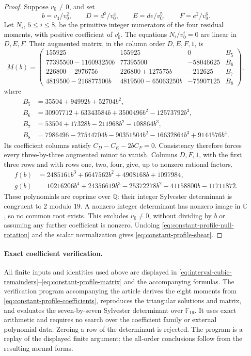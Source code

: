 \begin{proof}
Suppose \(v_0\ne0\), and set
\[
 b=v_1/v_0^2,\qquad D=d^2/v_0^4,\qquad E=de/v_0^5,\qquad F=e^2/v_0^6.
\]
Let \(N_i\), \(5\le i\le8\), be the primitive integer numerators of
the four residual moments, with positive coefficient of \(v_0^i\).
The equations \(N_i/v_0^i=0\) are linear in \(D,E,F\). Their augmented
matrix, in the column order \(D,E,F,1\), is
\begin{equation}
 M(b)=\begin{pmatrix}
 155925&155925&0&B_5\\
 77395500-116093250b&77395500&-58046625&B_6\\
 226800-297675b&226800+127575b&-212625&B_7\\
 4819500-216877500b&4819500-65063250b&-75907125&B_8
 \end{pmatrix},
 \label{eq:constant-profile-matrix}
\end{equation}
where
\begin{align*}
 B_5&=35504+94992b+52704b^2,\\
 B_6&=30907712+63343584b+3500496b^2-12573792b^3,\\
 B_7&=53504+17328b-211968b^2-108864b^3,\\
 B_8&=7986496-27544704b-90351504b^2-16632864b^3+9144576b^4.
\end{align*}
Its coefficient columns satisfy \(C_D-C_E-2bC_F=0\). Consistency
therefore forces every three-by-three augmented minor to vanish.
Columns \(D,F,1\), with the first three rows and with rows one, two,
four, give, up to nonzero rational factors,
\begin{align*}
 f(b)&=2485161b^3+6647562b^2+4908168b+1097984,\\
 g(b)&=10216206b^4+24356619b^3-25372278b^2-41158800b-11711872.
\end{align*}
These polynomials are coprime over \(\mathbb Q\): their integer
Sylvester determinant is congruent to \(2\) modulo \(19\). A nonzero
integer determinant has nonzero image in \(\mathbb C\), so no common
root exists. This excludes \(v_0\ne0\), without dividing by \(b\)
or assuming any further coefficient is nonzero. Undoing
\eqref{eq:constant-profile-null-rotation} and the scalar normalization
gives \eqref{eq:constant-profile-shear}.

\end{proof}

\paragraph{Exact coefficient verification.}
All finite inputs and identities used above are displayed in
\eqref{eq:interval-cubic-remainders}--\eqref{eq:constant-profile-matrix}
and the accompanying formulas. The verification program accompanying
the article derives the eight moments from
\eqref{eq:constant-profile-coefficients}, reproduces the triangular
solutions and matrix, and evaluates the seven-by-seven Sylvester
determinant over \(\mathbb F_{19}\). It uses exact arithmetic and
requires no search over the coefficient family or external polynomial
data. Zeroing a row of the determinant is rejected. The program is a
replay of the displayed finite argument; the all-order conclusions
follow from the resulting normal forms.
